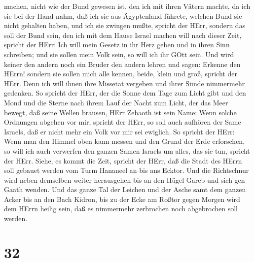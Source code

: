 machen,  nicht wie der Bund gewesen ist, den ich mit ihren
Vätern machte, da ich sie bei der Hand nahm, daß ich sie aus Ägyptenland
führete, welchen Bund sie nicht gehalten haben, und ich sie zwingen
mußte, spricht der HErr,  sondern das soll der Bund sein,
den ich mit dem Hause Israel machen will nach dieser Zeit, spricht der
HErr: Ich will mein Gesetz in ihr Herz geben und in ihren Sinn
schreiben; und sie sollen mein Volk sein, so will ich ihr GOtt sein.
 Und wird keiner den andern noch ein Bruder den andern
lehren und sagen: Erkenne den HErrn! sondern sie sollen mich alle
kennen, beide, klein und groß, spricht der HErr. Denn ich will ihnen
ihre Missetat vergeben und ihrer Sünde nimmermehr gedenken.
 So spricht der HErr, der die Sonne dem Tage zum Licht gibt
und den Mond und die Sterne nach ihrem Lauf der Nacht zum Licht, der das
Meer bewegt, daß seine Wellen brausen, HErr Zebaoth ist sein Name:
 Wenn solche Ordnungen abgehen vor mir, spricht der HErr,
so soll auch aufhören der Same Israels, daß er nicht mehr ein Volk vor
mir sei ewiglich.  So spricht der HErr: Wenn man den Himmel
oben kann messen und den Grund der Erde erforschen, so will ich auch
verwerfen den ganzen Samen Israels um alles, das sie tun, spricht der
HErr.  Siehe, es kommt die Zeit, spricht der HErr, daß die
Stadt des HErrn soll gebauet werden vom Turm Hananeel an bis ans Ecktor.
 Und die Richtschnur wird neben demselben weiter
herausgehen bis an den Hügel Gareb und sich gen Gaath wenden.
 Und das ganze Tal der Leichen und der Asche samt dem
ganzen Acker bis an den Bach Kidron, bis zu der Ecke am Roßtor gegen
Morgen wird dem HErrn heilig sein, daß es nimmermehr zerbrochen noch
abgebrochen soll werden.

\hypertarget{section-31}{%
\section{32}\label{section-31}}

